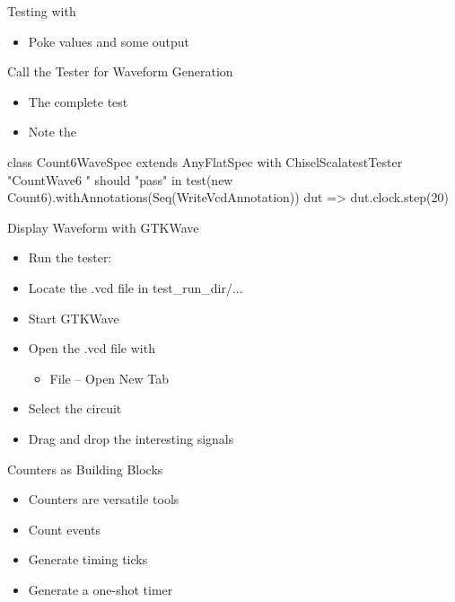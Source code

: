 \begin{frame}[fragile]{Testing with }
\begin{itemize}
\item Poke values and  some output
\end{itemize}
\end{frame}

\begin{frame}[fragile]{Call the Tester for Waveform Generation}
\begin{itemize}
\item The complete test
\item Note the 
\end{itemize}
\begin{chisel}
class Count6WaveSpec extends AnyFlatSpec with ChiselScalatestTester {
  "CountWave6 " should "pass" in {
    test(new Count6).withAnnotations(Seq(WriteVcdAnnotation)) { dut =>
      dut.clock.step(20)
    }
  }
}
\end{chisel}
\end{frame}

\begin{frame}[fragile]{Display Waveform with GTKWave}
\begin{itemize}
\item Run the tester: 
\item Locate the .vcd file in test\_run\_dir/...
\item Start GTKWave
\item Open the .vcd file with
\begin{itemize}
\item File -- Open New Tab
\end{itemize}
\item Select the circuit
\item Drag and drop the interesting signals
\end{itemize}
\end{frame}





\begin{frame}[fragile]{Counters as Building Blocks}
\begin{itemize}
\item Counters are versatile tools
\item Count events
\item Generate timing ticks
\item Generate a one-shot timer
\end{itemize}
\end{frame}

